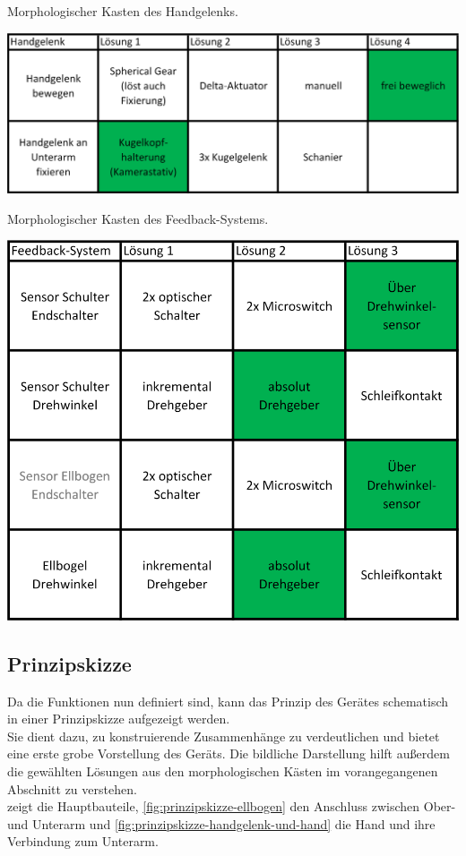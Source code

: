 %
			\begin{table}[h]
				\centering
				\caption[Morphologischer Kasten des Handgelenks]{Morphologischer Kasten des Handgelenks.}
				\includegraphics[width=.8\textwidth]{Abb/MorphoBoxes/Morphologischer_Kasten_Handgelenk.png}\label{tab:morphologische-kasten-handgelenk}
			\end{table}
%
			\begin{table}[h]
				\centering
				\caption[Morphologischer Kasten des Feedback-Systems]{Morphologischer Kasten des Feedback-Systems.}
				\includegraphics[width=.8\textwidth]{Abb/MorphoBoxes/Morphologischer_Kasten_Feedback-System.png}\label{tab:morphologische-kasten-feedback-system}
			\end{table}

		\subsection{Prinzipskizze}
			Da die Funktionen nun definiert sind, kann das Prinzip des Gerätes schematisch in einer Prinzipskizze aufgezeigt werden.\\
			Sie dient dazu, zu konstruierende Zusammenhänge zu verdeutlichen und bietet eine erste grobe Vorstellung des Geräts. Die bildliche Darstellung hilft außerdem die gewählten Lösungen aus den morphologischen Kästen im vorangegangenen Abschnitt zu verstehen.\\
			 zeigt die Hauptbauteile, \cref{fig:prinzipskizze-ellbogen} den Anschluss zwischen Ober- und Unterarm und \cref{fig:prinzipskizze-handgelenk-und-hand} die Hand und ihre Verbindung zum Unterarm.

